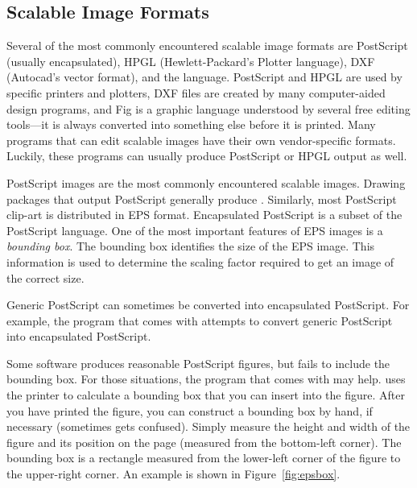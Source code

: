 \subsection{Scalable Image Formats}
\label{sec:scaleformat}

Several of the most commonly encountered scalable image formats are
PostScript (usually encapsulated), 
HPGL (Hewlett-Packard's
Plotter language), DXF (Autocad's vector format), and the  language.  PostScript
and HPGL are used by specific printers and plotters, DXF files are created
by many computer-aided design programs, and Fig is a graphic language
understood by several free editing tools---it is always converted into
something else before it is printed.  Many programs
that can edit scalable images have their own vendor-specific formats.
Luckily, these programs can usually produce PostScript or HPGL output
as well.

PostScript images are the most commonly encountered scalable images.
Drawing packages that output PostScript generally 
produce .  Similarly, most PostScript clip-art
is distributed in EPS format.  Encapsulated PostScript is a subset of
the PostScript language.  One of the most important features of EPS
images is a \emph{bounding box}.  
The bounding box identifies the size of
the EPS image.  This information is used to determine the
scaling factor required to get an image of the correct size.  

Generic PostScript can sometimes be converted into encapsulated
PostScript.  For example, the  program that comes
with  attempts to convert generic PostScript into
encapsulated PostScript.  

Some software produces reasonable PostScript figures, but fails to include the
bounding box.  For those situations, the  program 
that comes
with  may help.   uses the printer to calculate
a bounding box that you can insert into the figure.  After you have printed
the figure, you can construct a bounding box by hand, if necessary (sometimes
 gets confused).  Simply measure the height and width of the
figure and its position on the page (measured from the bottom-left corner).  
The bounding box is a rectangle measured from the
lower-left corner of the figure to the upper-right corner.
An example is shown in Figure~\ref{fig:epsbox}.  

